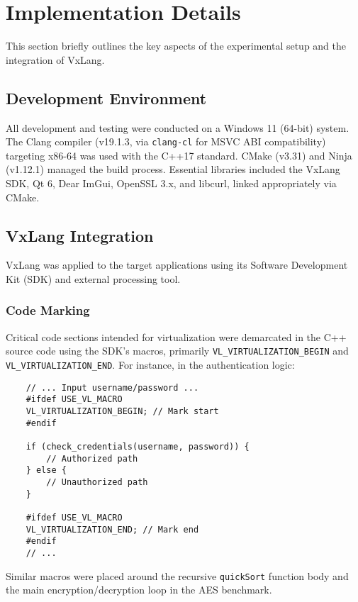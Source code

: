 \section{Implementation Details} \label{sec:implementation}
This section briefly outlines the key aspects of the experimental setup and the integration of VxLang.

\subsection{Development Environment}
All development and testing were conducted on a Windows 11 (64-bit) system. The Clang compiler (v19.1.3, via \texttt{clang-cl} for MSVC ABI compatibility) targeting x86-64 was used with the C++17 standard. CMake (v3.31) and Ninja (v1.12.1) managed the build process. Essential libraries included the VxLang SDK, Qt 6, Dear ImGui, OpenSSL 3.x, and libcurl, linked appropriately via CMake.

\subsection{VxLang Integration}
VxLang was applied to the target applications using its Software Development Kit (SDK) and external processing tool.

\subsubsection{Code Marking} Critical code sections intended for virtualization were demarcated in the C++ source code using the SDK's macros, primarily \texttt{VL\_VIRTUALIZATION\_BEGIN} and \texttt{VL\_VIRTUALIZATION\_END}. For instance, in the authentication logic:

\begin{verbatim}
    // ... Input username/password ...
    #ifdef USE_VL_MACRO
    VL_VIRTUALIZATION_BEGIN; // Mark start
    #endif

    if (check_credentials(username, password)) {
        // Authorized path
    } else {
        // Unauthorized path
    }

    #ifdef USE_VL_MACRO
    VL_VIRTUALIZATION_END; // Mark end
    #endif
    // ...
\end{verbatim}
Similar macros were placed around the recursive \texttt{quickSort} function body and the main encryption/decryption loop in the AES benchmark.

